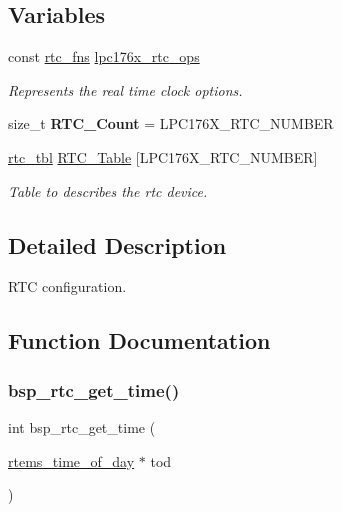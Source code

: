 \subsection*{Variables}
\begin{DoxyCompactItemize}
\item 
const \mbox{\hyperlink{struct__rtc__fns}{rtc\+\_\+fns}} \mbox{\hyperlink{arm_2lpc176x_2rtc_2rtc-config_8c_a51aa1a64786c5ecc9260d94849882d5c}{lpc176x\+\_\+rtc\+\_\+ops}}
\begin{DoxyCompactList}\small\item\em Represents the real time clock options. \end{DoxyCompactList}\item 
\mbox{\label{arm_2lpc176x_2rtc_2rtc-config_8c_a7b04b3ddbc07be0bcfcd73fde9a9f399}} 
size\+\_\+t {\bfseries R\+T\+C\+\_\+\+Count} = L\+P\+C176\+X\+\_\+\+R\+T\+C\+\_\+\+N\+U\+M\+B\+ER
\item 
\mbox{\hyperlink{struct__rtc__tbl}{rtc\+\_\+tbl}} \mbox{\hyperlink{arm_2lpc176x_2rtc_2rtc-config_8c_a9c9ee800165767e1b1c73ef1a9f0512c}{R\+T\+C\+\_\+\+Table}} \mbox{[}L\+P\+C176\+X\+\_\+\+R\+T\+C\+\_\+\+N\+U\+M\+B\+ER\mbox{]}
\begin{DoxyCompactList}\small\item\em Table to describes the rtc device. \end{DoxyCompactList}\end{DoxyCompactItemize}


\subsection{Detailed Description}
R\+TC configuration. 



\subsection{Function Documentation}
\mbox{\label{arm_2lpc176x_2rtc_2rtc-config_8c_a1d585829e114b224948f12d20ff2cdab}} 
\subsubsection{\texorpdfstring{bsp\_rtc\_get\_time()}{bsp\_rtc\_get\_time()}}
{\footnotesize\ttfamily int bsp\+\_\+rtc\+\_\+get\+\_\+time (\begin{DoxyParamCaption}\item[{\mbox{\hyperlink{structrtems__time__of__day}{rtems\+\_\+time\+\_\+of\+\_\+day}} $\ast$}]{tod }\end{DoxyParamCaption})}



